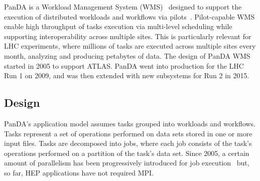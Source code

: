 %

PanDA is a Workload Management System (WMS)~\cite{marco2009glite} designed to
support the execution of distributed workloads and workflows via
pilots~\cite{turilli2015comprehensive}. Pilot-capable WMS enable high throughput
of tasks execution via multi-level scheduling while supporting interoperability
across multiple sites. This is particularly relevant for LHC experiments, where
millions of tasks are executed across multiple sites every month, analyzing and
producing petabytes of data. The design of PanDA WMS started in 2005 to support
ATLAS. PanDA went into production for the LHC Run 1 on 2009, and was then
extended with new subsystems for Run 2 in 2015.


\subsection{Design}
\label{ssec:panda_design}

PanDA's application model assumes tasks grouped into workloads and workflows.
Tasks represent a set of operations performed on data sets stored in one or more
input files. Tasks are decomposed into jobs, where each job consists of the
task's operations performed on a partition of the task's data set. Since 2005, a
certain amount of parallelism has been progressively introduced for job
execution~\cite{crooks2012multi} but, so far, HEP applications have not required
MPI.

